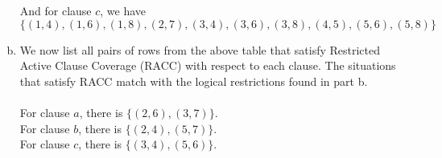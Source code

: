 \documentclass{article}
\begin{document}
\begin{enumerate}[(a)]
	And for clause $c$, we have
		$$ \{ (1, 4), (1, 6), (1, 8),
			  (2, 7),
			  (3, 4), (3, 6), (3, 8),
			  (4, 5),
			  (5, 6), (5, 8) \} $$
	\item We now list all pairs of rows from the above table that satisfy Restricted Active Clause Coverage (RACC) with respect to each clause.  The situations that satisfy RACC match with the logical restrictions found in part b. \\\\
	For clause $a$, there is $ \{ (2, 6), (3, 7) \} $. \\
	For clause $b$, there is $ \{ (2, 4), (5, 7) \} $. \\
	For clause $c$, there is $ \{ (3, 4), (5, 6) \} $.
\end{enumerate}
\end{document}
